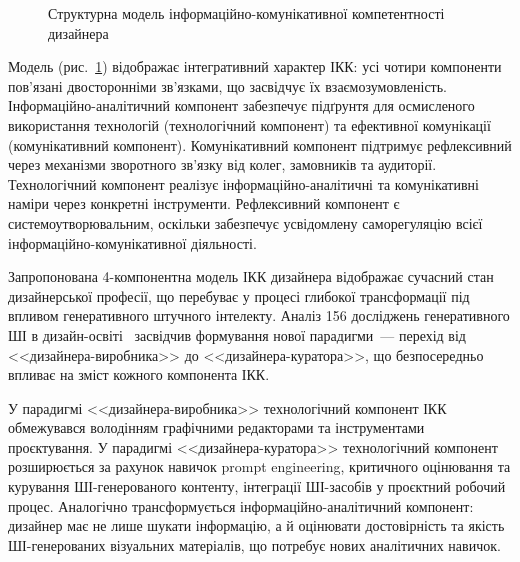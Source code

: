 \begin{figure}[!h]
{%
}
\caption{Структурна модель інформаційно-комунікативної компетентності дизайнера}
\label{fig:ikk_model}
\end{figure}

Модель (рис.~\ref{fig:ikk_model}) відображає інтегративний характер ІКК: усі чотири компоненти пов'язані двосторонніми зв'язками, що засвідчує їх взаємозумовленість. Інформаційно-аналітичний компонент забезпечує підґрунтя для осмисленого використання технологій (технологічний компонент) та ефективної комунікації (комунікативний компонент). Комунікативний компонент підтримує рефлексивний через механізми зворотного зв'язку від колег, замовників та аудиторії. Технологічний компонент реалізує інформаційно-аналітичні та комунікативні наміри через конкретні інструменти. Рефлексивний компонент є системоутворювальним, оскільки забезпечує усвідомлену саморегуляцію всієї інформаційно-комунікативної діяльності.


Запропонована 4-компонентна модель ІКК дизайнера відображає сучасний стан дизайнерської професії, що перебуває у процесі глибокої трансформації під впливом генеративного штучного інтелекту. Аналіз 156 досліджень генеративного ШІ в дизайн-освіті~\cite{Musiienko2026ScopingReview} засвідчив формування нової парадигми~--- перехід від <<дизайнера-виробника>> до <<дизайнера-куратора>>, що безпосередньо впливає на зміст кожного компонента ІКК.

У парадигмі <<дизайнера-виробника>> технологічний компонент ІКК обмежувався володінням графічними редакторами та інструментами проєктування. У парадигмі <<дизайнера-куратора>> технологічний компонент розширюється за рахунок навичок prompt engineering, критичного оцінювання та курування ШІ-генерованого контенту, інтеграції ШІ-засобів у проєктний робочий процес. Аналогічно трансформується інформаційно-аналітичний компонент: дизайнер має не лише шукати інформацію, а й оцінювати достовірність та якість ШІ-генерованих візуальних матеріалів, що потребує нових аналітичних навичок.

